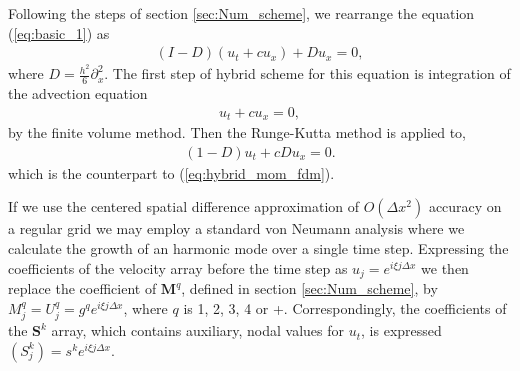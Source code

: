 \documentclass[review]{elsarticle}
\begin{document}
Following the steps of section \ref{sec:Num_scheme},
we rearrange 
the equation (\ref{eq:basic_1}) as
\begin{align}
(I-D)(u_t + c u_x) +Du_x = 0, \label{eq:basic_2}
\end{align}
where $D=\frac{h^2}{6}\partial_x^2$.
The first step of  hybrid scheme for  this equation is integration of
 the advection equation
\begin{align}
u_t + c u_x = 0,
\label{eq:append_advec}
\end{align}
by the finite volume method. 
Then the Runge-Kutta  method is applied to,
\begin{align}
(1-D)u_t + cDu_x = 0.
\label{eq:append_mom_fdm}
\end{align}
which is the counterpart to  (\ref{eq:hybrid_mom_fdm}).

If we use the centered spatial difference approximation of $O(\Delta x^2)$
accuracy on a regular grid we may employ a standard von Neumann analysis where we calculate the growth of an harmonic mode over a single time step.
Expressing the coefficients of the velocity array before the time step as  $u_j= e^{i\xi j \Delta x}$ we then replace the coefficient of $\textbf{M}^q$, defined in section \ref{sec:Num_scheme}, 
by $M_j^q=U_j^q= g^qe^{i\xi j \Delta x}$, 
where $q$ is 1, 2, 3, 4 or +. Correspondingly, the coefficients of the $\mathbf{S}^k$ array, which contains auxiliary,  nodal values for $u_t$,  is
expressed $(S_j^k)= s^k e^{i\xi j \Delta x}$. 
\end{document}
